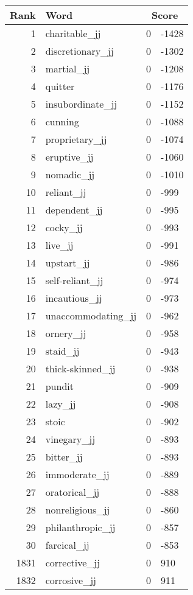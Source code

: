 \begin{longtable}[!htbp]{| rlr@{.}l |}
    \hline
    \textbf{Rank} & \textbf{Word} & \multicolumn{2}{c|}{\textbf{Score}} \\
    \hline
    \endhead
    1 & charitable\_jj & 0 & -1428 \\
    2 & discretionary\_jj & 0 & -1302 \\
    3 & martial\_jj & 0 & -1208 \\
    4 & quitter & 0 & -1176 \\
    5 & insubordinate\_jj & 0 & -1152 \\
    6 & cunning & 0 & -1088 \\
    7 & proprietary\_jj & 0 & -1074 \\
    8 & eruptive\_jj & 0 & -1060 \\
    9 & nomadic\_jj & 0 & -1010 \\
    10 & reliant\_jj & 0 & -999 \\
    11 & dependent\_jj & 0 & -995 \\
    12 & cocky\_jj & 0 & -993 \\
    13 & live\_jj & 0 & -991 \\
    14 & upstart\_jj & 0 & -986 \\
    15 & self-reliant\_jj & 0 & -974 \\
    16 & incautious\_jj & 0 & -973 \\
    17 & unaccommodating\_jj & 0 & -962 \\
    18 & ornery\_jj & 0 & -958 \\
    19 & staid\_jj & 0 & -943 \\
    20 & thick-skinned\_jj & 0 & -938 \\
    21 & pundit & 0 & -909 \\
    22 & lazy\_jj & 0 & -908 \\
    23 & stoic & 0 & -902 \\
    24 & vinegary\_jj & 0 & -893 \\
    25 & bitter\_jj & 0 & -893 \\
    26 & immoderate\_jj & 0 & -889 \\
    27 & oratorical\_jj & 0 & -888 \\
    28 & nonreligious\_jj & 0 & -860 \\
    29 & philanthropic\_jj & 0 & -857 \\
    30 & farcical\_jj & 0 & -853 \\
    1831 & corrective\_jj & 0 & 910 \\
    1832 & corrosive\_jj & 0 & 911 \\

\end{longtable}
